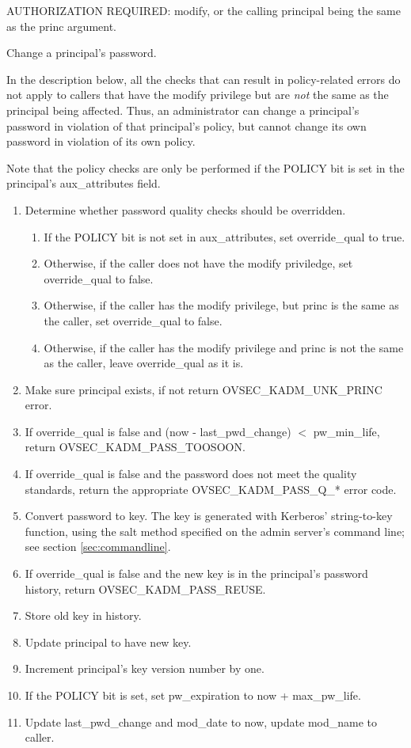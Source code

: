 AUTHORIZATION REQUIRED: modify, or the calling principal being the
same as the princ argument.

Change a principal's password.  

In the description below, all the checks that can result in
policy-related errors do not apply to callers that have the modify
privilege but are {\it not} the same as the principal being affected.
Thus, an administrator can change a principal's password in violation
of that principal's policy, but cannot change its own password in
violation of its own policy.

Note that the policy checks are only be performed if the POLICY bit is
set in the principal's aux_attributes field.

\begin{enumerate}
\item Determine whether password quality checks should be overridden.
\begin{enumerate}
\item If the POLICY bit is not set in aux_attributes, set
override_qual to true.
\item Otherwise, if the caller does not have the modify priviledge,
set override_qual to false.
\item Otherwise, if the caller has the modify privilege, but princ is the
same as the caller, set override_qual to false.
\item Otherwise, if the caller has the modify privilege and princ is
not the same as the caller, leave override_qual as it is.
\end{enumerate}
\item Make sure principal exists, if not return OVSEC_KADM_UNK_PRINC error.
\item If override_qual is false and (now - last_pwd_change) $<$
pw_min_life, return OVSEC_KADM_PASS_TOOSOON.
\item If override_qual is false and the password does not meet the quality
standards, return the appropriate OVSEC_KADM_PASS_Q_* error code.
\item Convert password to key.  The key is generated with
Kerberos' string-to-key function, using the salt method specified on
the admin server's command line; see section \ref{sec:commandline}.
\item If override_qual is false and the new key is in the principal's
password history, return OVSEC_KADM_PASS_REUSE.
\item Store old key in history.
\item Update principal to have new key.
\item Increment principal's key version number by one.
\item If the POLICY bit is set, set pw_expiration to now + max_pw_life.
\item Update last_pwd_change and mod_date to now, update mod_name to
caller.
\end{enumerate}


